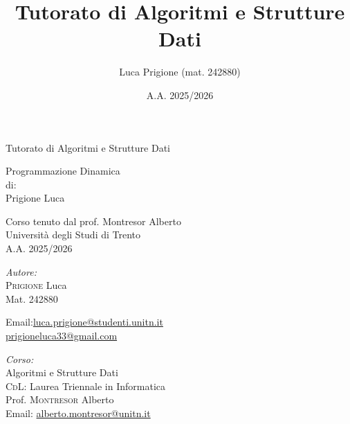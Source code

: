 \documentclass[a4paper,twoside]{report}
\title{Tutorato di Algoritmi e Strutture Dati}
\author{Luca Prigione (mat. 242880)}
\date{A.A. 2025/2026}
\begin{document}
    

    \begin{titlepage}
        \centering  %
        
        {\Huge\textbf\hfill{Tutorato di Algoritmi e Strutture Dati}\hfill} %
        \vspace{1.5cm}

        {\Large Programmazione Dinamica} \\[1cm] %

        
        {\normalsize di: } \\[.3cm]
        {\Large Prigione Luca} \\ %
        \vspace{1.5cm}
        

        {\normalsize Corso tenuto dal prof. Montresor Alberto} \\[0.3cm] %
        {\large Università degli Studi di Trento} \\[1.5cm]
        
        {\large A.A. 2025/2026} \\[3cm] %
        
        \vfill
        \begin{minipage}[t]{0.4\textwidth}
            \begin{flushleft} \normalsize
                \emph{Autore:}\\
                \textsc{Prigione} Luca \\ %
                Mat. 242880 \\
                \vspace{-\baselineskip}
                \begin{tabbing}
                    Email:\= \href{mailto:luca.prigione@studenti.unitn.it}{luca.prigione@studenti.unitn.it} \\
                        \>  \href{mailto:prigioneluca33@gmail.com}{prigioneluca33@gmail.com}
                \end{tabbing}
            \end{flushleft}
        \end{minipage}%
        \hfill
        \begin{minipage}[t]{0.4\textwidth}
            \begin{flushleft} \normalsize
                \emph{Corso:}\\
                Algoritmi e Strutture Dati \\
                \textsc{CdL}: Laurea Triennale in Informatica \\
                Prof. \textsc{Montresor} Alberto \\
                Email: \href{mailto:alberto.montresor@unitn.it}{alberto.montresor@unitn.it}
            \end{flushleft}
        \end{minipage}
        \vfill
    \end{titlepage}
    
    
\end{document}

